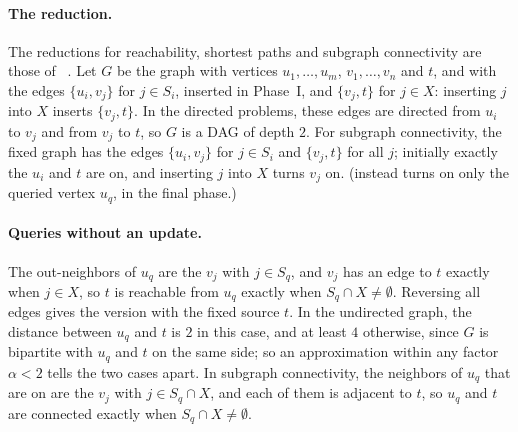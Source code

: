 \paragraph{The reduction.}
The reductions for reachability, shortest paths and subgraph connectivity are those of \Patrascu~\cite[Appendix~A]{patrascu_mihai_towards_2010}. Let $G$ be the graph with vertices $u_1,\dots,u_m$, $v_1,\dots,v_n$ and $t$, and with the edges $\{u_i,v_j\}$ for $j\in S_i$, inserted in Phase~I, and $\{v_j,t\}$ for $j\in X$: inserting $j$ into $X$ inserts $\{v_j,t\}$. In the directed problems, these edges are directed from $u_i$ to $v_j$ and from $v_j$ to $t$, so $G$ is a DAG of depth $2$. For subgraph connectivity, the fixed graph has the edges $\{u_i,v_j\}$ for $j\in S_i$ and $\{v_j,t\}$ for all $j$; initially exactly the $u_i$ and $t$ are on, and inserting $j$ into $X$ turns $v_j$ on. (\Patrascu instead turns on only the queried vertex $u_q$, in the final phase.)

\paragraph{Queries without an update.}
The out-neighbors of $u_q$ are the $v_j$ with $j\in S_q$, and $v_j$ has an edge to $t$ exactly when $j\in X$, so $t$ is reachable from $u_q$ exactly when $S_q\cap X\ne\emptyset$. Reversing all edges gives the version with the fixed source $t$. In the undirected graph, the distance between $u_q$ and $t$ is $2$ in this case, and at least $4$ otherwise, since $G$ is bipartite with $u_q$ and $t$ on the same side; so an approximation within any factor $\alpha<2$ tells the two cases apart. In subgraph connectivity, the neighbors of $u_q$ that are on are the $v_j$ with $j\in S_q\cap X$, and each of them is adjacent to $t$, so $u_q$ and $t$ are connected exactly when $S_q\cap X\ne\emptyset$.

